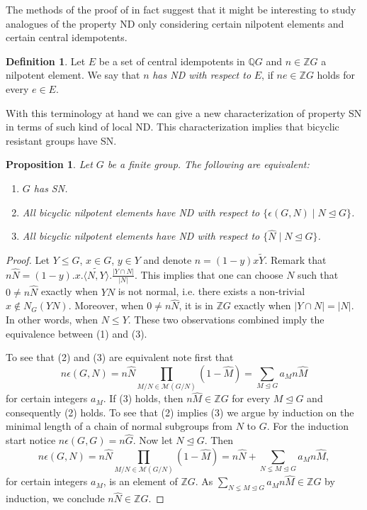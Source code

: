 \documentclass[a4paper,10pt]{amsart}
\newtheorem{proposition}[lemma]{Proposition}
\theoremstyle{definition}
\newtheorem{definition}[lemma]{Definition}
\theoremstyle{remark}
\newcommand\wt{\widetilde}
\newcommand\wh{\widehat}
\newcommand{\Z}{{\mathbb Z}}
\newcommand{\Q}{{\mathbb Q}}
\begin{document}
The methods of the proof of  in fact suggest that it might be interesting to study analogues of the property ND only considering certain nilpotent elements and certain central idempotents. 

\begin{definition} 
Let $E$ be a set of central idempotents in $\Q G$ and $n \in \mathbb{Z}G$ a nilpotent element. We say that $n$ \emph{has ND with respect to} $E$, if $ne \in \mathbb{Z}G$ holds for every $e \in E$. 
\end{definition}

With this terminology at hand we can give a new characterization of property SN in terms of such kind of local ND. This characterization implies that bicyclic resistant groups have SN. 

\begin{proposition}\label{SN via epsilon idemoptent}
Let $G$ be a finite group. The following are equivalent:
\begin{enumerate}
\item $G$ has SN.
\item All bicyclic nilpotent elements have ND with respect to $\{\epsilon(G,N) \mid N \unlhd G \}$.
\item All bicyclic nilpotent elements have ND with respect to $\{\wh{N} \mid N \unlhd G \}$.
\end{enumerate}
\end{proposition}
\begin{proof}
Let $Y \leq G$, $x\in G$, $y\in Y$ and denote $n = (1-y)x\widetilde{Y}$. Remark that  $n \wh{N} = (1-y).x. \wt{\langle N, Y\rangle}.\frac{|Y \cap N|}{|N|}$. This implies that one can choose $N$ such that $0\neq n \wh{N}$ exactly when $YN$ is not normal, i.e. there exists a non-trivial $x \notin N_G(YN)$. Moreover, when $0\neq n \wh{N}$, it is in $\Z G$ exactly when $|Y \cap N| = |N|$. In other words, when $N \leq Y$. These two observations combined imply the equivalence between (1) and (3). 

To see that (2) and (3) are equivalent note first that 
\[ n\epsilon(G,N) = n\wh{N} \prod_{M/N \in  \mathcal{M}(G/N)} (1 - \wh{M}) = \sum_{M \unlhd G} a_M n\wh{M}\]
for certain integers $a_M$. If (3) holds, then $n\wh{M} \in \mathbb{Z}G$ for every $M\unlhd G$ and consequently (2) holds. To see that (2) implies (3) we argue by induction on the minimal length of a chain of normal subgroups from $N$ to $G$. For the induction start notice $n\epsilon(G,G) = n\wh{G}$. Now let $N \unlhd G$. Then
\[ n\epsilon(G,N) = n\wh{N} \prod_{M/N \in  \mathcal{M}(G/N)} (1 - \wh{M}) = n \wh{N} + \sum_{N \lneq M \unlhd G} a_M n\wh{M},\]
for certain integers $a_M$, is an element of $\mathbb{Z}G$. As $\sum_{N \lneq M \unlhd G} a_M n\wh{M}  \in \mathbb{Z}G$ by induction, we conclude $n\wh{N} \in \mathbb{Z}G$.
\end{proof}
\end{document}
